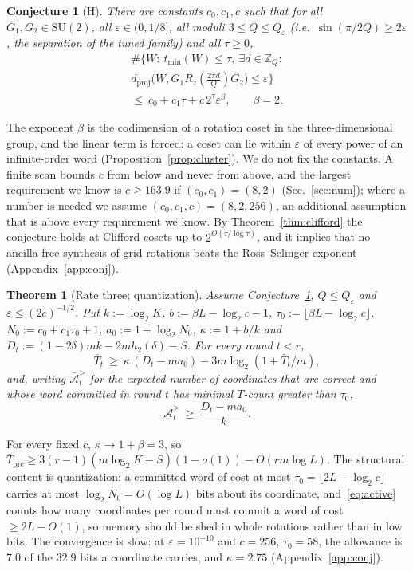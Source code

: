 \documentclass[aps,prx,twocolumn,superscriptaddress,nofootinbib,longbibliography]{revtex4-2}
\theoremstyle{plain}
\newtheorem{theorem}{Theorem}
\newtheorem{conjecture}{Conjecture}
\theoremstyle{definition}
\theoremstyle{remark}
\newcommand{\dproj}{d_{\mathrm{proj}}}
\newcommand{\Tpre}{T_{\mathrm{pre}}}
\newcommand{\Z}{\mathbb{Z}}
\newcommand{\SU}{\mathrm{SU}(2)}
\begin{document}
\begin{conjecture}[H]\label{conj:H}
There are constants $c_0,c_1,c$ such that for all $G_1,G_2\in\SU$, all $\varepsilon\in(0,1/8]$, all moduli $3\le Q\le Q_\varepsilon$ (i.e.\ $\sin(\pi/2Q)\ge2\varepsilon$, the separation of the tuned family) and all $\tau\ge0$,
\begin{multline}\label{eq:H}
\#\big\{W:\ t_{\min}(W)\le\tau,\ \exists d\in\Z_Q:\\ \dproj\big(W,G_1R_z(\tfrac{2\pi d}{Q})G_2\big)\le\varepsilon\big\}\\ \le\ c_0+c_1\tau+c\,2^\tau\varepsilon^{\beta},\qquad\beta=2 .
\end{multline}
\end{conjecture}
The exponent $\beta$ is the codimension of a rotation coset in the three-dimensional group, and the linear term is forced: a coset can lie within $\varepsilon$ of every power of an infinite-order word (Proposition~\ref{prop:cluster}). We do not fix the constants. A finite scan bounds $c$ from below and never from above, and the largest requirement we know is $c\ge163.9$ if $(c_0,c_1)=(8,2)$ (Sec.~\ref{sec:num}); where a number is needed we assume $(c_0,c_1,c)=(8,2,256)$, an additional assumption that is above every requirement we know. By Theorem~\ref{thm:clifford} the conjecture holds at Clifford cosets up to $2^{O(\tau/\log\tau)}$, and it implies that no ancilla-free synthesis of grid rotations beats the Ross--Selinger exponent (Appendix~\ref{app:conj}).


\begin{theorem}[Rate three; quantization]\label{thm:main2}
Assume Conjecture~\ref{conj:H}, $Q\le Q_\varepsilon$ and $\varepsilon\le(2c)^{-1/2}$. Put $k:=\log_2K$, $b:=\beta L-\log_2c-1$, $\tau_0:=\lfloor\beta L-\log_2c\rfloor$, $N_0:=c_0+c_1\tau_0+1$, $a_0:=1+\log_2N_0$, $\kappa:=1+b/k$ and $D_t:=(1-2\delta)mk-2mh_2(\delta)-S$. For every round $t<r$,
\begin{equation}\label{eq:rate3}
\bar T_t\ \ge\ \kappa\,(D_t-ma_0)-3m\log_2(1+\bar T_t/m),
\end{equation}
and, writing $\bar{\mathcal A}^{>}_t$ for the expected number of coordinates that are correct and whose word committed in round $t$ has minimal $T$-count greater than $\tau_0$,
\begin{equation}\label{eq:active}
\bar{\mathcal A}^{>}_t\ \ge\ \frac{D_t-ma_0}{k}.
\end{equation}
\end{theorem}
For every fixed $c$, $\kappa\to1+\beta=3$, so $\bar\Tpre\ge3(r-1)(m\log_2K-S)(1-o(1))-O(rm\log L)$. The structural content is quantization: a committed word of cost at most $\tau_0=\lfloor2L-\log_2c\rfloor$ carries at most $\log_2N_0=O(\log L)$ bits about its coordinate, and~\eqref{eq:active} counts how many coordinates per round must commit a word of cost $\ge2L-O(1)$, so memory should be shed in whole rotations rather than in low bits. The convergence is slow: at $\varepsilon=10^{-10}$ and $c=256$, $\tau_0=58$, the allowance is $7.0$ of the $32.9$ bits a coordinate carries, and $\kappa=2.75$ (Appendix~\ref{app:conj}).
\end{document}

